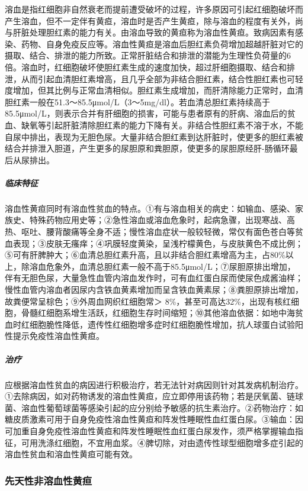 溶血是指红细胞非自然衰老而提前遭受破坏的过程，许多原因可引起红细胞破坏而产生溶血，但不一定伴有黄疸，溶血时是否产生黄疸，除与溶血的程度有关外，尚与肝脏处理胆红素的能力有关。由溶血导致的黄疸称为溶血性黄疸。致病因素有感染、药物、自身免疫反应等。溶血性黄疸是溶血后胆红素负荷增加超越肝脏对它的摄取、结合、排泄的能力所致。正常肝脏结合和排泄的潜能为生理性负荷量的6倍。溶血时，红细胞破坏使胆红素生成的速度加快，超过肝细胞摄取、结合和排泄，从而引起血清胆红素增高，且几乎全部为非结合胆红素，结合性胆红素也可轻度增加，但其比例与正常血清相似。胆红素生成增加，而肝清除能力正常时，血清胆红素一般在51.3～85.5μmol/L（3～5mg/dl）。若血清总胆红素持续高于85.5μmol/L，则表示合并有肝细胞的损害，可能与患者原有的肝病、溶血后的贫血、缺氧等引起肝脏清除胆红素的能力下降有关。非结合性胆红素不溶于水，不能自尿中排出，表现为无胆色尿。大量非结合胆红素到达肝脏时，使更多的胆红素被结合并排泄入胆道，产生更多的尿胆原和粪胆原，使更多的尿胆原经肝-肠循环最后从尿排出。

\subparagraph{临床特征}

溶血性黄疸同时有溶血性贫血的特点。①有与溶血相关的病史：如输血、感染、家族史、特殊药物应用史等；②急性溶血或溶血危象时，起病急骤，出现寒战、高热、呕吐、腰背酸痛等全身不适；慢性溶血症状一般较轻微，常仅有面色苍白等贫血表现；③皮肤无瘙痒；④巩膜轻度黄染，呈浅柠檬黄色，与皮肤黄色不成比例；⑤可有肝脾肿大；⑥血清总胆红素升高，且以非结合胆红素增高为主，占80\%以上，除溶血危象外，血清总胆红素一般不高于85.5μmol/L；⑦尿胆原排出增加，伴有无胆色尿，大量急性血管内溶血发作时，可有血红蛋白尿而使尿色成酱油样；慢性血管内溶血者因尿内含铁血黄素增加而呈含铁血黄素尿；⑧粪胆原排出增加，故粪便常呈棕色；⑨外周血网织红细胞常＞
8\%，甚至可高达32\%，出现有核红细胞，骨髓红细胞系增生活跃，红细胞生存时间缩短；⑩其他溶血依据：如地中海贫血时红细胞脆性降低，遗传性红细胞增多症时红细胞脆性增加，抗人球蛋白试验阳性提示免疫性溶血性黄疸。

\subparagraph{治疗}

应根据溶血性贫血的病因进行积极治疗，若无法针对病因则针对其发病机制治疗。①去除病因，如对药物诱发的溶血性黄疸，应立即停用该药物；若是厌氧菌、链球菌、溶血性葡萄球菌等感染引起的应分别给予敏感的抗生素治疗。②药物治疗：如糖皮质激素可用于自身免疫性溶血性黄疸和阵发性睡眠性血红蛋白尿。③输血：因可加重自身免疫性溶血性黄疸和阵发性睡眠性血红蛋白尿发作，须严格掌握输血指征，可用洗涤红细胞，不宜用血浆。④脾切除，对由遗传性球型细胞增多症引起的溶血性贫血和溶血性黄疸可能有效。

\subsubsection{先天性非溶血性黄疸}

